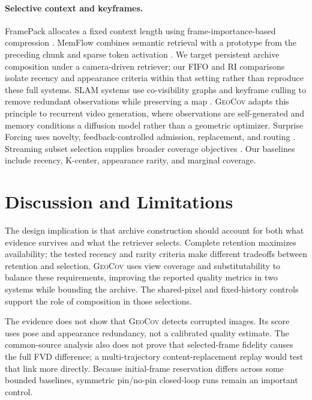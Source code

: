 \documentclass[10pt,twocolumn]{article}
\newcommand{\Geo}{\textsc{GeoCov}\xspace}
\newcommand{\RI}{\textsc{RI}\xspace}
\begin{document}
\paragraph{Selective context and keyframes.}
FramePack allocates a fixed context length using frame-importance-based
compression \citep{framepack}. MemFlow combines semantic retrieval with a
prototype from the preceding chunk and sparse token activation
\citep{memflow}. We target persistent archive composition under a camera-driven
retriever; our FIFO and \RI comparisons isolate recency and appearance criteria
within that setting rather than reproduce these full systems.
SLAM systems use co-visibility graphs and keyframe culling to remove redundant
observations while preserving a map \citep{orbslam,orbslam2}. \Geo adapts this
principle to recurrent video generation, where observations are self-generated
and memory conditions a diffusion model rather than a geometric optimizer.
Surprise Forcing uses novelty, feedback-controlled
admission, replacement, and routing \citep{surpriseforcing}. Streaming subset
selection supplies broader coverage objectives \citep{nemhauser1978,
badanidiyuru2014}. Our baselines include recency, K-center, appearance rarity,
and marginal coverage.

\section{Discussion and Limitations}
\label{sec:limitations}

The design implication is that archive construction should account for both
what evidence survives and what the retriever selects. Complete retention
maximizes availability; the tested recency and rarity criteria make different
tradeoffs between retention and selection. \Geo uses view coverage and
substitutability to balance these requirements, improving the reported quality
metrics in two systems while bounding the archive. The shared-pixel and
fixed-history controls support the role of composition in those selections.

The evidence does not show that \Geo detects corrupted images. Its score uses
pose and appearance redundancy, not a calibrated quality estimate. The
common-source analysis also does not prove that selected-frame fidelity causes
the full FVD difference; a multi-trajectory content-replacement replay would
test that link more directly. Because initial-frame reservation differs across
some bounded baselines, symmetric pin/no-pin closed-loop runs remain an
important control.
\end{document}
